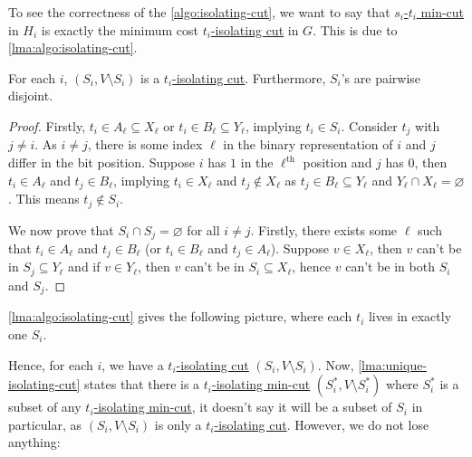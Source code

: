 To see the correctness of the \autoref{algo:isolating-cut}, we want to say that \hyperref[prb:s-t-min-cut]{\(s_i\)-\(t_i\) min-cut} in \(H_i\) is exactly the minimum cost \hyperref[prb:isolating-cut]{\(t_i\)-isolating cut} in \(G\). This is due to \autoref{lma:algo:isolating-cut}.

\begin{lemma}\label{lma:algo:isolating-cut}
	For each \(i\), \((S_i, V\setminus S_i)\) is a \hyperref[prb:isolating-cut]{\(t_i\)-isolating cut}. Furthermore, \(S_i\)'s are pairwise disjoint.
\end{lemma}
\begin{proof}
	Firstly, \(t_i \in A_{\ell } \subseteq X_{\ell }\) or \(t_i \in B_{\ell } \subseteq Y_{\ell } \), implying \(t_i \in S_i\). Consider \(t_j\) with \(j \neq i\). As \(i \neq j\), there is some index \(\ell \) in the binary representation of \(i\) and \(j\) differ in the bit position. Suppose \(i\) has \(1\) in the \(\ell ^{\text{th} }\) position and \(j\) has \(0\), then \(t_i \in A_{\ell } \) and \(t_j \in B_{\ell } \), implying \(t_i \in X_{\ell } \) and \(t_j \notin X_{\ell } \) as \(t_j \in B_{\ell } \subseteq Y_{\ell } \) and \(Y_{\ell } \cap X_{\ell } = \varnothing \). This means \(t_j \notin S_i\).

	We now prove that \(S_i \cap S_j = \varnothing \) for all \(i \neq j\). Firstly, there exists some \(\ell \) such that \(t_i \in A_{\ell } \) and \(t_j \in B_{\ell } \) (or \(t_i \in B_{\ell } \) and \(t_j \in A_{\ell } \)). Suppose \(v \in X_{\ell } \), then \(v\) can't be in \(S_j \subseteq Y_{\ell } \) and if \(v \in Y_{\ell } \), then \(v\) can't be in \(S_i \subseteq X_{\ell } \), hence \(v\) can't be in both \(S_i\) and \(S_j\).
\end{proof}

\autoref{lma:algo:isolating-cut} gives the following picture, where each \(t_i\) lives in exactly one \(S_i\).

\begin{figure}[H]
	\centering
\end{figure}

Hence, for each \(i\), we have a \hyperref[prb:isolating-cut]{\(t_i\)-isolating cut} \((S_i, V\setminus S_i)\). Now, \autoref{lma:unique-isolating-cut} states that there is a \hyperref[prb:isolating-cut]{\(t_i\)-isolating min-cut} \((S_i^{\ast} , V\setminus S_i^{\ast} )\) where \(S_i^{\ast}\) is a subset of any \hyperref[prb:isolating-cut]{\(t_i\)-isolating min-cut}, it doesn't say it will be a subset of \(S_i\) in particular, as \((S_i, V\setminus S_i)\) is only a \hyperref[prb:isolating-cut]{\(t_i\)-isolating cut}. However, we do not lose anything:

